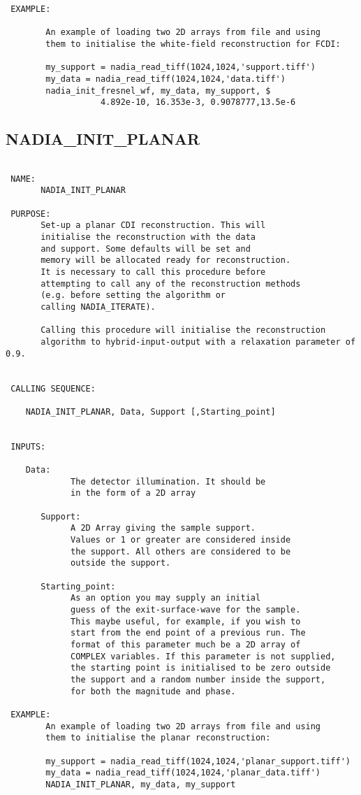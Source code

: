 \begin{verbatim}
 EXAMPLE:

        An example of loading two 2D arrays from file and using
        them to initialise the white-field reconstruction for FCDI:

        my_support = nadia_read_tiff(1024,1024,'support.tiff')
        my_data = nadia_read_tiff(1024,1024,'data.tiff')
        nadia_init_fresnel_wf, my_data, my_support, $
                   4.892e-10, 16.353e-3, 0.9078777,13.5e-6

\end{verbatim}

\subsection{NADIA\_INIT\_PLANAR}
\begin{verbatim}

 NAME:
       NADIA_INIT_PLANAR

 PURPOSE:
       Set-up a planar CDI reconstruction. This will
       initialise the reconstruction with the data
       and support. Some defaults will be set and
       memory will be allocated ready for reconstruction.
       It is necessary to call this procedure before
       attempting to call any of the reconstruction methods
       (e.g. before setting the algorithm or 
       calling NADIA_ITERATE).

       Calling this procedure will initialise the reconstruction 
       algorithm to hybrid-input-output with a relaxation parameter of 0.9.


 CALLING SEQUENCE:

	NADIA_INIT_PLANAR, Data, Support [,Starting_point]


 INPUTS:

	Data: 
             The detector illumination. It should be
             in the form of a 2D array

       Support: 
             A 2D Array giving the sample support.
             Values or 1 or greater are considered inside
             the support. All others are considered to be
             outside the support.

       Starting_point: 
             As an option you may supply an initial 
             guess of the exit-surface-wave for the sample. 
             This maybe useful, for example, if you wish to 
             start from the end point of a previous run. The
             format of this parameter much be a 2D array of
             COMPLEX variables. If this parameter is not supplied,
             the starting point is initialised to be zero outside
             the support and a random number inside the support, 
             for both the magnitude and phase.

 EXAMPLE:
        An example of loading two 2D arrays from file and using
        them to initialise the planar reconstruction:

        my_support = nadia_read_tiff(1024,1024,'planar_support.tiff')
        my_data = nadia_read_tiff(1024,1024,'planar_data.tiff')
        NADIA_INIT_PLANAR, my_data, my_support


\end{verbatim}
